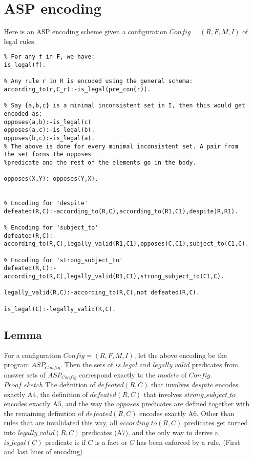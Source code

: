 \section{ASP encoding}
Here is an ASP encoding scheme given a configuration $Config = (R,F,M,I)$ of legal rules.
\begin{verbatim}
% For any f in F, we have:
is_legal(f).    

% Any rule r in R is encoded using the general schema:
according_to(r,C_r):-is_legal(pre_con(r)).

% Say {a,b,c} is a minimal inconsistent set in I, then this would get encoded as: 
opposes(a,b):-is_legal(c)
opposes(a,c):-is_legal(b).
opposes(b,c):-is_legal(a).
% The above is done for every minimal inconsistent set. A pair from the set forms the opposes
%predicate and the rest of the elements go in the body.

opposes(X,Y):-opposes(Y,X).


% Encoding for 'despite'
defeated(R,C):-according_to(R,C),according_to(R1,C1),despite(R,R1).

% Encoding for 'subject_to'
defeated(R,C):-according_to(R,C),legally_valid(R1,C1),opposes(C,C1),subject_to(C1,C).

% Encoding for 'strong_subject_to'
defeated(R,C):-according_to(R,C),legally_valid(R1,C1),strong_subject_to(C1,C).

legally_valid(R,C):-according_to(R,C),not defeated(R,C).

is_legal(C):-legally_valid(R,C).
\end{verbatim}
\subsection{Lemma}
For a configuration $Config=(R,F,M,I)$, let the above encoding be the program $ASP_{Config}$. Then the sets of $is\_legal$ and $legally\_valid$ predicates from answer sets of $ASP_{Config}$ correspond exactly to the $models$ of $Config$.\\
\newline
$Proof$ $sketch$ The definition of $defeated(R,C)$ that involves $despite$ encodes exactly A4, the definition of $defeated(R,C)$ that involves $strong\_subject\_to$ encodes exactly A5, and the way the $opposes$ predicates are defined together with the remaining definition of $defeated(R,C)$ encodes exactly A6. Other than rules that are invalidated this way, all $according\_to(R,C)$ predicates get turned into $legally\_valid(R,C)$ predicates (A7), and the only way to derive a $is\_legal(C)$ predicate is if $C$ is a fact or $C$ has been enforced by a rule. (First and last lines of encoding) 
